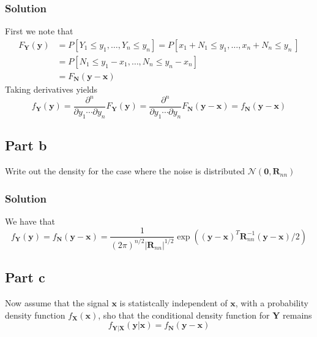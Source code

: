 \documentclass[a4paper]{article}
\begin{document}
\subsubsection*{Solution}%
First we note that
\[
  \begin{aligned}
    F_{\mathbf{Y}}(\mathbf{y}) &= P \left[ Y_1 \leq  y_1, \dots, Y_n \leq y_n\right] = P \left[ x_1 + N_1 \leq y_1, \dots, x_n + N_n \leq y_n \ \right] \\
                               &= P \left[N_1 \leq y_1 - x_1, \dots, N_n \leq y_n - x_n\right]\\
                               &= F_{\mathbf{N}}(\mathbf{y} - \mathbf{x})
  \end{aligned}
\]
Taking derivatives yields
\[
  f_{\mathbf{Y}}(\mathbf{y}) = \frac{\partial ^n}{\partial y_1 \cdots \partial y_n}F_{\mathbf{Y}}(\mathbf{y}) = \frac{\partial ^n}{\partial y_1 \cdots \partial y_n} F_{\mathbf{N}}(\mathbf{y} - \mathbf{x}) = f_{\mathbf{N}}(\mathbf{y} - \mathbf{x})
\]

\subsection*{Part b}%
Write out the density for the case where the noise is distributed $\mathcal{N}(\mathbf{0}, \mathbf{R}_{nn})$

\subsubsection*{Solution}%
We have that
\[
  f_{\mathbf{Y}}(\mathbf{y}) = f_{\mathbf{N}}(\mathbf{y} - \mathbf{x}) = \frac{1}{(2\pi)^{n/2}|\mathbf{R}_{nn}|^{1/2}} \exp\left((\mathbf{y} - \mathbf{x})^T \mathbf{R}_{nn}^{-1}(\mathbf{y} - \mathbf{x})/2\right)
\]

\subsection*{Part c}%
Now assume that the signal $\mathbf{x}$ is statistcally independent of $\mathbf{x}$, with a probability density function $f_{\mathbf{X}}(\mathbf{x})$, sho that the conditional density function for $\mathbf{Y}$ remains
\[
  f_{\mathbf{Y}|\mathbf{X}}(\mathbf{y}|\mathbf{x}) = f_{\mathbf{N}}(\mathbf{y} - \mathbf{x})
\]
\end{document}
